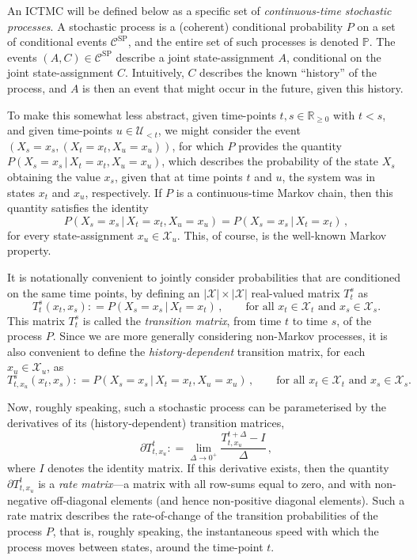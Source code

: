 \documentclass[twoside,11pt]{article}
\newcommand{\reals}{\mathbb{R}}
\newcommand{\realsnonneg}{\reals_{\geq 0}}
\newcommand{\states}{\mathcal{X}}
\newcommand{\processes}{\mathbb{P}}
\newcommand{\coloneqq}{:\!=}
\begin{document}
An ICTMC will be defined below as a specific set of \emph{continuous-time stochastic processes}. A stochastic process is a (coherent) conditional probability $P$ on a set of conditional events $\mathcal{C}^\mathrm{SP}$, and the entire set of such processes is denoted $\processes$. The events $(A,C)\in\mathcal{C}^\mathrm{SP}$ describe a joint state-assignment $A$, conditional on the joint state-assignment $C$. Intuitively, $C$ describes the known ``history'' of the process, and $A$ is then an event that might occur in the future, given this history. 

To make this somewhat less abstract, given time-points $t,s\in\realsnonneg$ with $t<s$, and given time-points $u\in\mathcal{U}_{<t}$, we might consider the event $(X_s=x_s, (X_t=x_t,X_u=x_u))$, for which $P$ provides the quantity $P(X_s=x_s\,\vert\,X_t=x_t,X_u=x_u)$, which describes the probability of the state $X_s$ obtaining the value $x_s$, given that at time points $t$ and $u$, the system was in states $x_t$ and $x_u$, respectively. If $P$ is a continuous-time Markov chain, then this quantity satisfies the identity
\begin{equation*}
P(X_s=x_s\,\vert\,X_t=x_t,X_u=x_u) = P(X_s=x_s\,\vert\,X_t=x_t)\,,
\end{equation*}
for every state-assignment $x_u\in\states_u$. This, of course, is the well-known Markov property.

It is notationally convenient to jointly consider probabilities that are conditioned on the same time points, by defining an $\lvert\states\rvert\times\lvert\states\rvert$ real-valued matrix $T_t^s$ as
\begin{equation*}
T_t^s(x_t,x_s) \coloneqq P(X_s=x_s\,\vert\,X_t=x_t)\,,\quad\quad\text{for all $x_t\in\states_t$ and $x_s\in\states_s$.}
\end{equation*}
This matrix $T_t^s$ is called the \emph{transition matrix}, from time $t$ to time $s$, of the process $P$. Since we are more generally considering non-Markov processes, it is also convenient to define the \emph{history-dependent} transition matrix, for each $x_u\in\states_u$, as
\begin{equation*}
T_{t,x_u}^s(x_t,x_s) \coloneqq P(X_s=x_s\,\vert\,X_t=x_t,X_u=x_u)\,,\quad\quad\text{for all $x_t\in\states_t$ and $x_s\in\states_s$}.
\end{equation*}

Now, roughly speaking, such a stochastic process can be parameterised by the derivatives of its (history-dependent) transition matrices,
\begin{equation}\label{eq:deriv_limit_is_rate}
\partial T_{t,x_u}^t \coloneqq \lim_{\Delta\to 0^+}\frac{T_{t,x_u}^{t+\Delta}-I}{\Delta}\,,
\end{equation}
where $I$ denotes the identity matrix. If this derivative exists, then the quantity $\partial T_{t,x_u}^t$ is a \emph{rate matrix}---a matrix with all row-sums equal to zero, and with non-negative off-diagonal elements (and hence non-positive diagonal elements). Such a rate matrix describes the rate-of-change of the transition probabilities of the process $P$, that is, roughly speaking, the instantaneous speed with which the process moves between states, around the time-point $t$. 
\end{document}
